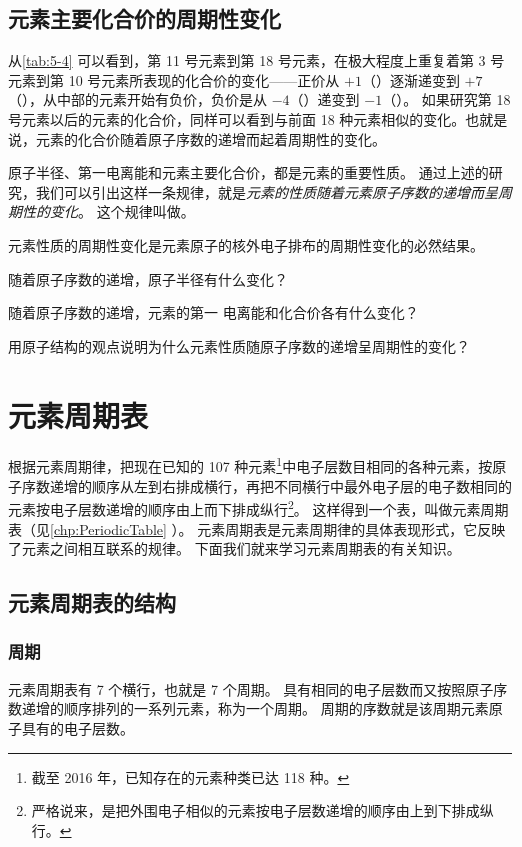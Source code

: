 \subsection{元素主要化合价的周期性变化}
从\cref{tab:5-4} 可以看到，第 11 号元素到第 18 号元素，在极大程度上重复着第 3 号元素到第 10 号元素所表现的化合价的变化——正价从 $+1$（）逐渐递变到 $+7$（），从中部的元素开始有负价，负价是从 $-4$（）递变到 $-1$（）。
如果研究第 18 号元素以后的元素的化合价，同样可以看到与前面 18 种元素相似的变化。也就是说，元素的化合价随着原子序数的递增而起着周期性的变化。

原子半径、第一电离能和元素主要化合价，都是元素的重要性质。
通过上述的研究，我们可以引出这样一条规律，就是\emph{元素的性质随着元素原子序数的递增而呈周期性的变化}。 
这个规律叫做。

元素性质的周期性变化是元素原子的核外电子排布的周期性变化的必然结果。

\begin{Practice}[习题]
  \begin{question}
    \item 随着原子序数的递增，原子半径有什么变化？
    \item 随着原子序数的递增，元素的第一 电离能和化合价各有什么变化？
    \item 用原子结构的观点说明为什么元素性质随原子序数的递增呈周期性的变化？
  \end{question}
\end{Practice}
\section{元素周期表}
根据元素周期律，把现在已知的 107 种元素\footnote{截至 2016 年，已知存在的元素种类已达 118 种。}中电子层数目相同的各种元素，按原子序数递增的顺序从左到右排成横行，再把不同横行中最外电子层的电子数相同的元素按电子层数递增的顺序由上而下排成纵行\footnote{严格说来，是把外围电子相似的元素按电子层数递增的顺序由上到下排成纵行。}。
这样得到一个表，叫做元素周期表（见\cref{chp:PeriodicTable} ）。
元素周期表是元素周期律的具体表现形式，它反映了元素之间相互联系的规律。
下面我们就来学习元素周期表的有关知识。

\subsection{元素周期表的结构}
\subsubsection{周期}
元素周期表有 7 个横行，也就是 7 个周期。
具有相同的电子层数而又按照原子序数递增的顺序排列的一系列元素，称为一个周期。
周期的序数就是该周期元素原子具有的电子层数。

